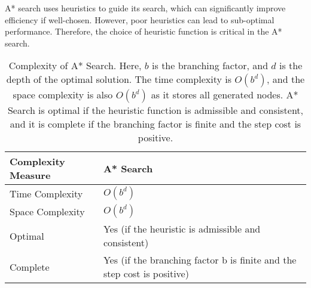 \documentclass[a4paper,UKenglish,cleveref, autoref, thm-restate]{qlinhta}
\begin{document}
    A* search uses heuristics to guide its search, which can significantly improve efficiency if well-chosen. However, poor heuristics can lead to sub-optimal performance. Therefore, the choice of heuristic function is critical in the A* search.

    \begin{table}[H]
        \centering
        \begin{tabular}{|l|l|}
            \hline
            \textbf{Complexity Measure} & \textbf{A* Search}                                                      \\
            \hline
            Time Complexity             & $O(b^d)$                                                                \\
            \hline
            Space Complexity            & $O(b^d)$                                                                \\
            \hline
            Optimal                     & Yes (if the heuristic is admissible and consistent)                     \\
            \hline
            Complete                    & Yes (if the branching factor b is finite and the step cost is positive) \\
            \hline
        \end{tabular}
        \caption{Complexity of A* Search. Here, $b$ is the branching factor, and $d$ is the depth of the optimal solution. The time complexity is $O(b^d)$, and the space complexity is also $O(b^d)$ as it stores all generated nodes. A* Search is optimal if the heuristic function is admissible and consistent, and it is complete if the branching factor is finite and the step cost is positive.}
        \label{tab:astar_complexity_detailed}
    \end{table}
\end{document}

